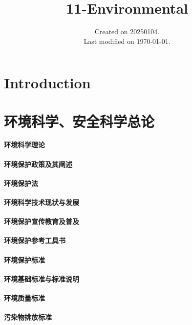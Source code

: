 \documentclass[UTF8]{../ApplicationUniverse}
\begin{document}
\title{11-Environmental}
\date{Created on 20250104.\\   Last modified on \today.}
\maketitle
\tableofcontents


\chapter{Introduction}




\chapter{环境科学、安全科学总论}
\subsubsection{环境科学理论}
    \subsubsection{环境保护政策及其阐述}
        \subsubsection{环境保护法}
\subsubsection{环境科学技术现状与发展}
\subsubsection{环境保护宣传教育及普及}
\subsubsection{环境保护参考工具书}
    \subsubsection{环境保护标准}
        \subsubsection{环境基础标准与标准说明}
        \subsubsection{环境质量标准}
        \subsubsection{污染物排放标准}
\end{document}
